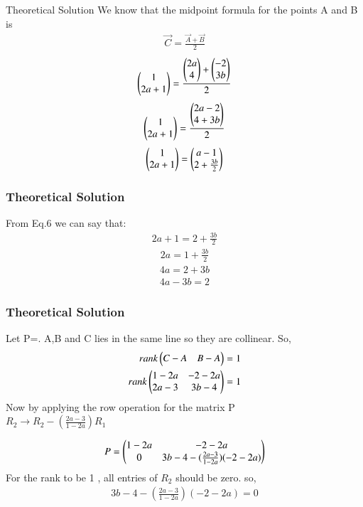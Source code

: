 \documentclass{beamer}
\begin{document}
\begin{frame}{Theoretical Solution}
We know that the midpoint formula for the points A and B is
\begin{align}
    \vec{C}=\frac{\vec{A}+\vec{B}}{2}
    \end{align}
\begin{align}
    \begin{pmatrix}1\\2a+1\end{pmatrix}=\frac{\begin{pmatrix}2a\\4\end{pmatrix}+\begin{pmatrix}-2\\3b\end{pmatrix}}{2}
\end{align}
\begin{align}
    \begin{pmatrix}1\\2a+1\end{pmatrix}=\frac{\begin{pmatrix}2a-2\\4+3b\end{pmatrix}}{2}
\end{align}
\begin{align}
    \begin{pmatrix}1\\2a+1\end{pmatrix}=\begin{pmatrix}a-1\\2+\frac{3b}{2}\end{pmatrix}
\end{align}

\end{frame}
\begin{frame}
\frametitle{Theoretical Solution}
From Eq.6 we can say that:
\begin{align}
    2a+1=2+\frac{3b}{2}
\end{align}
\begin{align}
    2a=1+\frac{3b}{2}
\end{align}
\begin{align}
    4a=2+3b
\end{align}
\begin{align}
    4a-3b=2
\end{align}

\end{frame}
\begin{frame}
\frametitle{Theoretical Solution}

Let P=. A,B and C lies in the same line so they are collinear. So,
\begin{align}
   rank\begin{pmatrix}C-A&B-A\end{pmatrix}=1\\
   rank\begin{pmatrix}1-2a&-2-2a\\
   2a-3&3b-4\end{pmatrix}=1
\end{align}
Now by applying the row operation for the matrix P\\
$R_2\longrightarrow R_2-(\frac{2a-3}{1-2a})R_1$

\begin{align}
    P=\begin{pmatrix}1-2a&-2-2a\\0&3b-4-(\frac{2a-3}{1-2a})(-2-2a)\end{pmatrix}
\end{align}
For the rank to be 1 , all entries of $R_2$ should be zero. so,
\begin{align}
3b-4-(\frac{2a-3}{1-2a})(-2-2a)=0
\end{align}

\end{frame}
\end{document}
